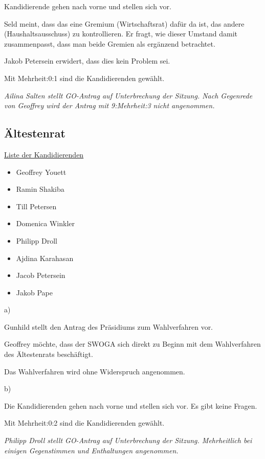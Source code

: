\documentclass[ngerman,headheight=70pt]{scrartcl}
\begin{document}
    Kandidierende gehen nach vorne und stellen sich vor.

    Seld meint, dass das eine Gremium (Wirtschaftsrat) dafür da ist, das andere
    (Haushaltsausschuss) zu kontrollieren. Er fragt, wie dieser Umstand damit
    zusammenpasst, dass man beide Gremien als ergänzend betrachtet.

    Jakob Petersein erwidert, dass dies kein Problem sei.

    Mit Mehrheit:0:1 sind die Kandidierenden gewählt.

    \textit{Ailina Salten stellt GO-Antrag auf Unterbrechung der Sitzung.
    Nach Gegenrede von Geoffrey wird der Antrag mit 9:Mehrheit:3 nicht
    angenommen.}

    \subsection{Ältestenrat}

    \underline{Liste der Kandidierenden}
    \begin{itemize}
        \item Geoffrey Youett
        \item Ramin Shakiba
        \item Till Petersen
        \item Domenica Winkler
        \item Philipp Droll
        \item Ajdina Karahasan
        \item Jacob Petersein
        \item Jakob Pape
    \end{itemize}

    a)

    Gunhild stellt den Antrag des Präsidiums zum Wahlverfahren vor.

    Geoffrey möchte, dass der SWOGA sich direkt zu Beginn mit dem Wahlverfahren
    des Ältestenrats beschäftigt.

    Das Wahlverfahren wird ohne Widerspruch angenommen.

    b)

    Die Kandidierenden gehen nach vorne und stellen sich vor. Es gibt
    keine Fragen.

    Mit Mehrheit:0:2 sind die Kandidierenden gewählt.

    \textit{Philipp Droll stellt GO-Antrag auf Unterbrechung der Sitzung.
    Mehrheitlich bei einigen Gegenstimmen und Enthaltungen angenommen.}
\end{document}
